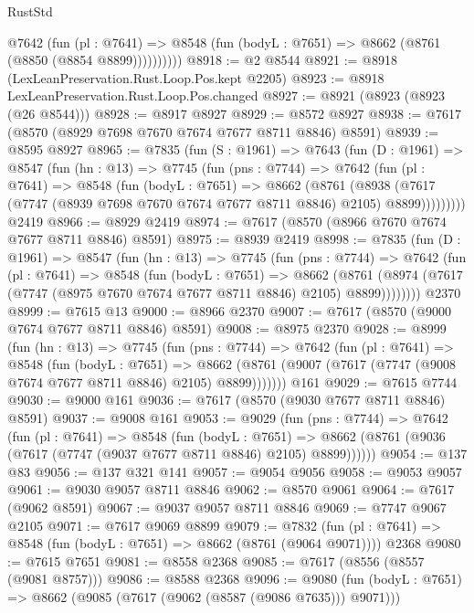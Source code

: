 \begin{lexlean}{RustStd}
\begin{coremodule}
            @7642
              (fun (pl : @7641) =>
              @8548 (fun (bodyL : @7651) => @8662 (@8761 (@8850 (@8854 @8899))))))))))
@8918 := @2 @8544
@8921 := @8918 (LexLeanPreservation.Rust.Loop.Pos.kept @2205)
@8923 := @8918 LexLeanPreservation.Rust.Loop.Pos.changed
@8927 := @8921 (@8923 (@8923 (@26 @8544)))
@8928 := @8917 @8927
@8929 := @8572 @8927
@8938 := @7617 (@8570 (@8929 @7698 @7670 @7674 @7677 @8711 @8846) @8591)
@8939 := @8595 @8927
@8965 := @7835
    (fun (S : @1961) =>
    @7643
      (fun (D : @1961) =>
      @8547
        (fun (hn : @13) =>
        @7745
          (fun (pns : @7744) =>
          @7642
            (fun (pl : @7641) =>
            @8548
              (fun (bodyL : @7651) =>
              @8662
                (@8761
                  (@8938
                    (@7617 (@7747 (@8939 @7698 @7670 @7674 @7677 @8711 @8846) @2105) @8899)))))))))
    @2419
@8966 := @8929 @2419
@8974 := @7617 (@8570 (@8966 @7670 @7674 @7677 @8711 @8846) @8591)
@8975 := @8939 @2419
@8998 := @7835
    (fun (D : @1961) =>
    @8547
      (fun (hn : @13) =>
      @7745
        (fun (pns : @7744) =>
        @7642
          (fun (pl : @7641) =>
          @8548
            (fun (bodyL : @7651) =>
            @8662
              (@8761 (@8974 (@7617 (@7747 (@8975 @7670 @7674 @7677 @8711 @8846) @2105) @8899))))))))
    @2370
@8999 := @7615 @13
@9000 := @8966 @2370
@9007 := @7617 (@8570 (@9000 @7674 @7677 @8711 @8846) @8591)
@9008 := @8975 @2370
@9028 := @8999
    (fun (hn : @13) =>
    @7745
      (fun (pns : @7744) =>
      @7642
        (fun (pl : @7641) =>
        @8548
          (fun (bodyL : @7651) =>
          @8662 (@8761 (@9007 (@7617 (@7747 (@9008 @7674 @7677 @8711 @8846) @2105) @8899)))))))
    @161
@9029 := @7615 @7744
@9030 := @9000 @161
@9036 := @7617 (@8570 (@9030 @7677 @8711 @8846) @8591)
@9037 := @9008 @161
@9053 := @9029
    (fun (pns : @7744) =>
    @7642
      (fun (pl : @7641) =>
      @8548
        (fun (bodyL : @7651) =>
        @8662 (@8761 (@9036 (@7617 (@7747 (@9037 @7677 @8711 @8846) @2105) @8899))))))
@9054 := @137 @83
@9056 := @137 @321 @141
@9057 := @9054 @9056
@9058 := @9053 @9057
@9061 := @9030 @9057 @8711 @8846
@9062 := @8570 @9061
@9064 := @7617 (@9062 @8591)
@9067 := @9037 @9057 @8711 @8846
@9069 := @7747 @9067 @2105
@9071 := @7617 @9069 @8899
@9079 := @7832
    (fun (pl : @7641) => @8548 (fun (bodyL : @7651) => @8662 (@8761 (@9064 @9071))))
    @2368
@9080 := @7615 @7651
@9081 := @8558 @2368
@9085 := @7617 (@8556 (@8557 (@9081 @8757)))
@9086 := @8588 @2368
@9096 := @9080
    (fun (bodyL : @7651) => @8662 (@9085 (@7617 (@9062 (@8587 (@9086 @7635))) @9071)))

\end{coremodule}
\end{lexlean}
